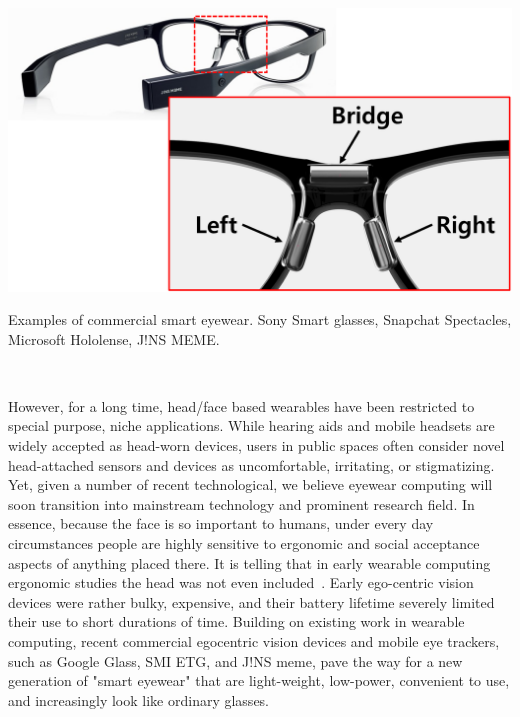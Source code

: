 \documentclass{sigchi-ext}
\begin{document}
\begin{marginfigure}[0pc]
\begin{minipage}{\marginparwidth}
   \includegraphics[width=\columnwidth]{figures/1-4}

  \caption{Examples of commercial smart eyewear. Sony Smart glasses, Snapchat Spectacles, Microsoft Hololense, J!NS MEME.}~\label{fig:glasses}
 \end{minipage}
\end{marginfigure} However, for a long time, head/face based wearables have been restricted to special purpose, niche applications.  While hearing aids and mobile headsets are widely accepted as head-worn devices, users in public spaces often consider novel head-attached sensors and devices as uncomfortable, irritating, or stigmatizing. Yet, given a number of recent technological, we believe eyewear computing will soon transition into mainstream technology and prominent research field. In essence, because the face is so important to humans, under every day circumstances people are highly sensitive to ergonomic and social acceptance aspects of anything placed there. It is telling that in early wearable computing ergonomic studies the head was not even included~\cite{bodine2003effects}. Early ego-centric vision devices were rather bulky, expensive, and their battery lifetime severely limited their use to short durations of time\cite{cakmakci2006head}. Building on existing work in wearable computing, recent commercial egocentric vision devices and mobile eye trackers, such as Google Glass, SMI ETG, and J!NS meme, pave the way for a new generation of "smart eyewear" that are light-weight, low-power, convenient to use, and increasingly look like ordinary glasses\cite{bulling2014cognition,kliegl2006tracking}.
\end{document}
